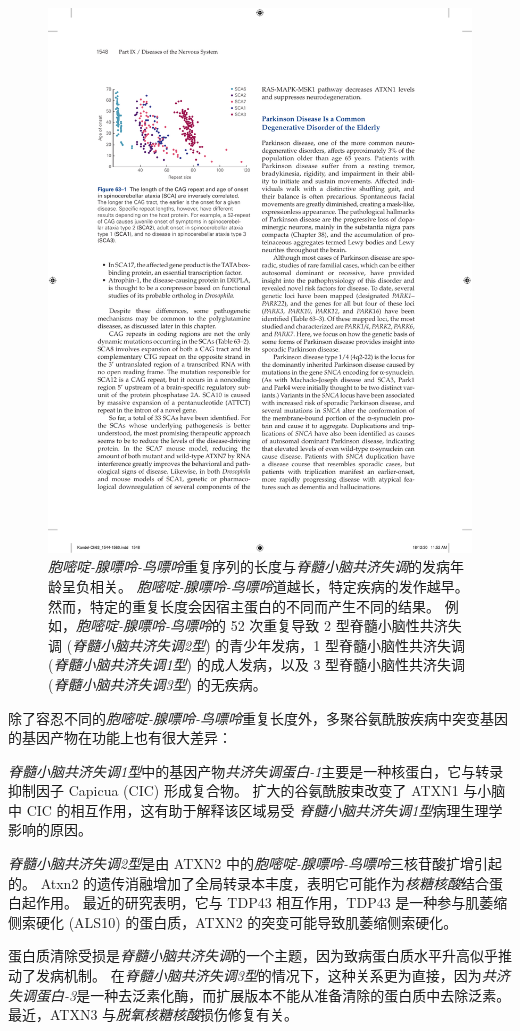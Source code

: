 \begin{figure}[htbp]
	\centering
	\includegraphics[width=0.5\linewidth]{chap63/fig_63_1}
	\caption{\textit{胞嘧啶-腺嘌呤-鸟嘌呤}重复序列的长度与\textit{脊髓小脑共济失调}的发病年龄呈负相关。
		\textit{胞嘧啶-腺嘌呤-鸟嘌呤}道越长，特定疾病的发作越早。
		然而，特定的重复长度会因宿主蛋白的不同而产生不同的结果。
		例如，\textit{胞嘧啶-腺嘌呤-鸟嘌呤}的 52 次重复导致 2 型脊髓小脑性共济失调 (\textit{脊髓小脑共济失调2型}) 的青少年发病，1 型脊髓小脑性共济失调 (\textit{脊髓小脑共济失调1型}) 的成人发病，以及 3 型脊髓小脑性共济失调 (\textit{脊髓小脑共济失调3型}) 的无疾病。}
	\label{fig:63_1}
\end{figure}


除了容忍不同的\textit{胞嘧啶-腺嘌呤-鸟嘌呤}重复长度外，多聚谷氨酰胺疾病中突变基因的基因产物在功能上也有很大差异：


\textit{脊髓小脑共济失调1型}中的基因产物\textit{共济失调蛋白-1}主要是一种核蛋白，它与转录抑制因子 Capicua (CIC) 形成复合物。
扩大的谷氨酰胺束改变了 ATXN1 与小脑中 CIC 的相互作用，这有助于解释该区域易受 \textit{脊髓小脑共济失调1型}病理生理学影响的原因。


\textit{脊髓小脑共济失调2型}是由 ATXN2 中的\textit{胞嘧啶-腺嘌呤-鸟嘌呤}三核苷酸扩增引起的。
Atxn2 的遗传消融增加了全局转录本丰度，表明它可能作为\textit{核糖核酸}结合蛋白起作用。
最近的研究表明，它与 TDP43 相互作用，TDP43 是一种参与肌萎缩侧索硬化 (ALS10) 的蛋白质，ATXN2 的突变可能导致肌萎缩侧索硬化。


蛋白质清除受损是\textit{脊髓小脑共济失调}的一个主题，因为致病蛋白质水平升高似乎推动了发病机制。
在\textit{脊髓小脑共济失调3型}的情况下，这种关系更为直接，因为\textit{共济失调蛋白-3}是一种去泛素化酶，而扩展版本不能从准备清除的蛋白质中去除泛素。
最近，ATXN3 与\textit{脱氧核糖核酸}损伤修复有关。


